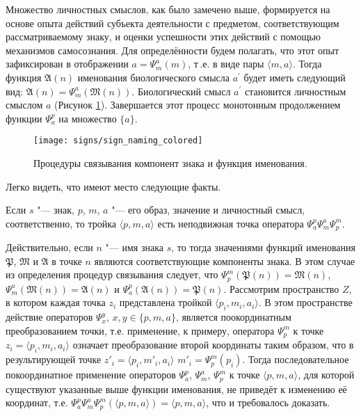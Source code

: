 Множество личностных смыслов, как было замечено выше, формируется на основе опыта действий субъекта деятельности с предметом, соответствующим рассматриваемому знаку, и оценки успешности этих действий с помощью механизмов самосознания. Для определённости будем полагать, что этот опыт зафиксирован в отображении $a=\Psi_m^a(m)$, т\,.е. в виде пары $\langle m,a\rangle$. Тогда функция $\mathfrak A(n)$ именования биологического смысла $a^\prime$ будет иметь следующий вид: $\mathfrak A(n)=\Psi_m^a(\mathfrak M(n))$. Биологический смысл $a^\prime$ становится личностным смыслом $a$ (Рисунок \ref{fg:sign_naming}). Завершается этот процесс монотонным продолжением функции $\Psi_a^p$ на множество $\{a\}$.

\begin{figure}[h]
	\centering
	\texttt{[image: signs/sign\_naming\_colored]}
	\caption{Процедуры связывания компонент знака и функция именования.}
	\label{fg:sign_naming}
\end{figure}

Легко видеть, что имеют место следующие факты.
\begin{Pred}
	\label{pred:fixed_point}
	Если $s$ "--- знак, $p$, $m$, $a$ "--- его образ, значение и личностный смысл, соответственно, то тройка $\langle p,m,a\rangle$ есть неподвижная точка оператора $\Psi_a^p\Psi_m^a\Psi_p^m$.
\end{Pred}
\begin{Proof}
	Действительно, если $n$ "--- имя знака $s$, то тогда значениями функций именования $\mathfrak P$, $\mathfrak M$ и $\mathfrak A$ в точке $n$ являются соответствующие компоненты знака. В этом случае из определения процедур связывания следует, что $\Psi_p^m(\mathfrak P(n))=\mathfrak M(n)$, $\Psi_m^a(\mathfrak M(n))=\mathfrak A(n)$ и $\Psi_a^p(\mathfrak A(n))=\mathfrak P(n)$. Рассмотрим пространство $Z$, в котором каждая точка $z_i$ представлена тройкой $\langle p_i,m_i,a_i\rangle$. В этом пространстве действие операторов $\Psi_x^y$, $x,y\in\{p,m,a\}$, является поокординатным преобразованием точки, т.е. применение, к примеру, оператора $\Psi_p^m$ к точке $z_i=\langle p_i,m_i,a_i\rangle$ означает преобразование второй координаты таким образом, что в результирующей точке $z'_i=\langle p_i,m'_i,a_i\rangle$ $m'_i=\Psi_p^m(p_i)$. Тогда последовательное покоординатное применение операторов $\Psi_a^p$, $\Psi_m^a$, $\Psi_p^m$ к точке $\langle p,m,a\rangle$, для которой существуют указанные выше функции именования, не приведёт к изменению её координат, т.е. $\Psi_a^p\Psi_m^a\Psi_p^m(\langle p,m,a\rangle)=\langle p,m,a\rangle$, что и требовалось доказать.
\end{Proof}


